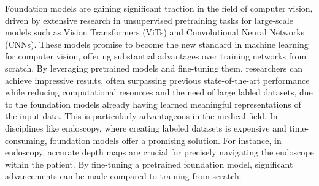 
Foundation models are gaining significant traction in the field of computer vision, driven by extensive research in unsupervised pretraining tasks for large-scale models such as Vision Transformers (ViTs) and Convolutional Neural Networks (CNNs). 
These models promise to become the new standard in machine learning for computer vision, offering substantial advantages over training networks from scratch. 
By leveraging pretrained models and fine-tuning them, researchers can achieve impressive results, often surpassing previous state-of-the-art performance while reducing computational resources and the need of large labled datasets, due to the foundation models already having learned meaningful representations of the input data.
This is particularly advantageous in the medical field. 
In disciplines like endoscopy, where creating labeled datasets is expensive and time-consuming, foundation models offer a promising solution.
For instance, in endoscopy, accurate depth maps are crucial for precisely navigating the endoscope within the patient. 
By fine-tuning a pretrained foundation model, significant advancements can be made compared to training from scratch.

